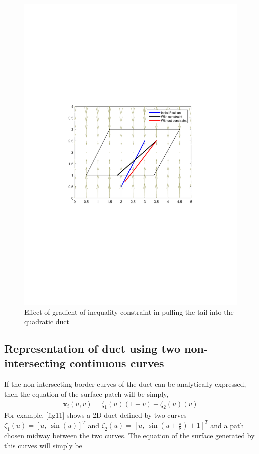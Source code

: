 \documentclass[11pt,a4paper]{article}
\begin{document}
\begin{figure}[h]
\centering
\includegraphics[scale=0.75]{figures/fig10b.pdf}
\caption{ Effect of gradient of inequality constraint in pulling the tail into the quadratic duct \label{fig:quadgradient}}
\end{figure}


\subsection{Representation of duct using two non-intersecting continuous curves}
If the non-intersecting border curves of the duct can be analytically expressed, then the equation of the surface patch will be simply,
\begin{align}
\mathbf{x}_i(u,v)= \zeta_1(u)\left(1-{v}\right) +\zeta_2(u)\left({v}\right)
\end{align}
For example, [fig11] shows a 2D duct defined by two curves $\zeta_1(u) = \left[u,~\sin\left(u \right)\right]^T$ and $\zeta_2(u) = \left[u,~\sin\left(u +\frac{\pi}{8}\right)+1\right]^T$ and a path chosen midway between the two curves. The equation of the surface generated by this curves will simply be
\end{document}
